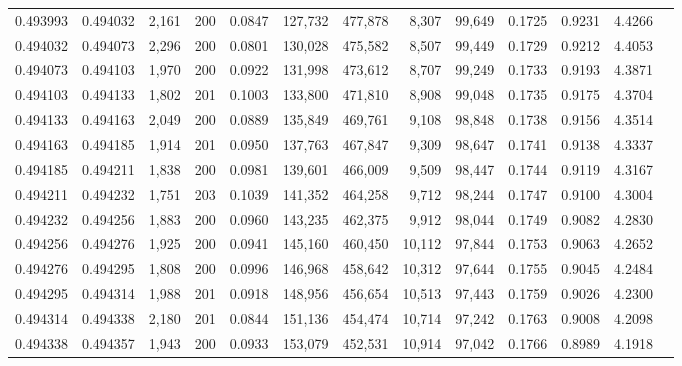 \begin{tabular}{rrrrrrrrrrrrr}
0.493993 & 0.494032 & 2,161 & 200 &                                     0.0847 & 127,732 & 477,878 &   8,307 &  99,649 & 0.1725 & 0.9231 & 4.4266 \\
0.494032 & 0.494073 & 2,296 & 200 &                                     0.0801 & 130,028 & 475,582 &   8,507 &  99,449 & 0.1729 & 0.9212 & 4.4053 \\
0.494073 & 0.494103 & 1,970 & 200 &                                     0.0922 & 131,998 & 473,612 &   8,707 &  99,249 & 0.1733 & 0.9193 & 4.3871 \\
0.494103 & 0.494133 & 1,802 & 201 &                                     0.1003 & 133,800 & 471,810 &   8,908 &  99,048 & 0.1735 & 0.9175 & 4.3704 \\
0.494133 & 0.494163 & 2,049 & 200 &                                     0.0889 & 135,849 & 469,761 &   9,108 &  98,848 & 0.1738 & 0.9156 & 4.3514 \\
0.494163 & 0.494185 & 1,914 & 201 &                                     0.0950 & 137,763 & 467,847 &   9,309 &  98,647 & 0.1741 & 0.9138 & 4.3337 \\
0.494185 & 0.494211 & 1,838 & 200 &                                     0.0981 & 139,601 & 466,009 &   9,509 &  98,447 & 0.1744 & 0.9119 & 4.3167 \\
0.494211 & 0.494232 & 1,751 & 203 &                                     0.1039 & 141,352 & 464,258 &   9,712 &  98,244 & 0.1747 & 0.9100 & 4.3004 \\
0.494232 & 0.494256 & 1,883 & 200 &                                     0.0960 & 143,235 & 462,375 &   9,912 &  98,044 & 0.1749 & 0.9082 & 4.2830 \\
0.494256 & 0.494276 & 1,925 & 200 &                                     0.0941 & 145,160 & 460,450 &  10,112 &  97,844 & 0.1753 & 0.9063 & 4.2652 \\
0.494276 & 0.494295 & 1,808 & 200 &                                     0.0996 & 146,968 & 458,642 &  10,312 &  97,644 & 0.1755 & 0.9045 & 4.2484 \\
0.494295 & 0.494314 & 1,988 & 201 &                                     0.0918 & 148,956 & 456,654 &  10,513 &  97,443 & 0.1759 & 0.9026 & 4.2300 \\
0.494314 & 0.494338 & 2,180 & 201 &                                     0.0844 & 151,136 & 454,474 &  10,714 &  97,242 & 0.1763 & 0.9008 & 4.2098 \\
0.494338 & 0.494357 & 1,943 & 200 &                                     0.0933 & 153,079 & 452,531 &  10,914 &  97,042 & 0.1766 & 0.8989 & 4.1918 \\

\end{tabular}
